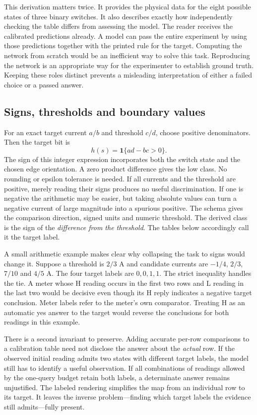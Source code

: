 \documentclass[12pt,letterpaper]{article}
\begin{document}
This derivation matters twice. It provides the physical data for the eight possible states of three binary switches. It also describes exactly how independently checking the table differs from assessing the model. The reader receives the calibrated predictions already. A model can pass the entire experiment by using those predictions together with the printed rule for the target. Computing the network from scratch would be an inefficient way to solve this task. Reproducing the network is an appropriate way for the experimenter to establish ground truth. Keeping these roles distinct prevents a misleading interpretation of either a failed choice or a passed answer.

\subsection{Signs, thresholds and boundary values}

For an exact target current $a/b$ and threshold $c/d$, choose positive denominators. Then the target bit is
\[
                  h(s)=\mathbf 1\{ a d-b c>0\}.
\]
The sign of this integer expression incorporates both the switch state and the chosen edge orientation. A zero product difference gives the low class. No rounding or epsilon tolerance is needed. If all currents and the threshold are positive, merely reading their signs produces no useful discrimination. If one is negative the arithmetic may be easier, but taking absolute values can turn a negative current of large magnitude into a spurious positive. The schema gives the comparison direction, signed units and numeric threshold. The derived class is the sign of the \emph{difference from the threshold}. The tables below accordingly call it the target label.

A small arithmetic example makes clear why collapsing the task to signs would change it. Suppose a threshold is $2/3$ A and candidate currents are $-1/4$, $2/3$, $7/10$ and $4/5$ A. The four target labels are $0,0,1,1$. The strict inequality handles the tie. A meter whose H reading occurs in the first two rows and L reading in the last two would be decisive even though its H reply indicates a negative target conclusion. Meter labels refer to the meter's own comparator. Treating H as an automatic yes answer to the target would reverse the conclusions for both readings in this example.

There is a second invariant to preserve. Adding accurate per-row comparisons to a calibration table need not disclose the answer about the \emph{actual} row. If the observed initial reading admits two states with different target labels, the model still has to identify a useful observation. If all combinations of readings allowed by the one-query budget retain both labels, a determinate answer remains unjustified. The labeled rendering simplifies the map from an individual row to its target. It leaves the inverse problem---finding which target labels the evidence still admits---fully present.
\end{document}
